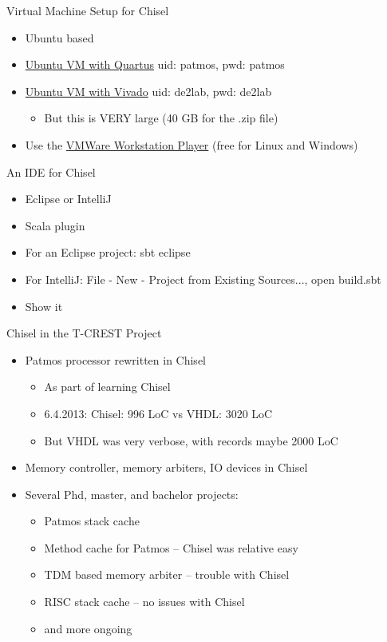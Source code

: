 \documentclass[xcolor=pdflatex,dvipsnames,table]{beamer}
\begin{document}
\begin{frame}[fragile]{Virtual Machine Setup for Chisel}
\begin{itemize}
\item Ubuntu based
\item \href{http://patmos.compute.dtu.dk/patmos-dev.zip}{Ubuntu VM with Quartus} uid: patmos, pwd: patmos
\item \href{https://patmos-download.compute.dtu.dk/de2lab.zip}{Ubuntu VM with Vivado} uid: de2lab, pwd: de2lab
\begin{itemize}
\item But this is VERY large (40 GB for the .zip file)
\end{itemize}
\item Use the  \href{https://www.vmware.com/products/workstation-player.html} {VMWare Workstation Player} (free for Linux and Windows)
\end{itemize}
\end{frame}


\begin{frame}[fragile]{An IDE for Chisel}
\begin{itemize}
\item Eclipse or IntelliJ
\item Scala plugin
\item For an Eclipse project: sbt eclipse
\item For IntelliJ: File - New - Project from Existing Sources..., open build.sbt
\item Show it
\end{itemize}
\end{frame}

\begin{frame}[fragile]{Chisel in the T-CREST Project}
\begin{itemize}
\item Patmos processor rewritten in Chisel
\begin{itemize}
\item As part of learning Chisel
\item 6.4.2013: Chisel: 996 LoC vs VHDL: 3020 LoC
\item But VHDL was very verbose, with records maybe 2000 LoC
\end{itemize}
\item Memory controller, memory arbiters, IO devices in Chisel
\item Several Phd, master, and bachelor projects:
\begin{itemize}
\item Patmos stack cache
\item Method cache for Patmos -- Chisel was relative easy
\item TDM based memory arbiter -- trouble with Chisel
\item RISC stack cache -- no issues with Chisel
\item and more ongoing 
\end{itemize}
\end{itemize}
\end{frame}
\end{document}

